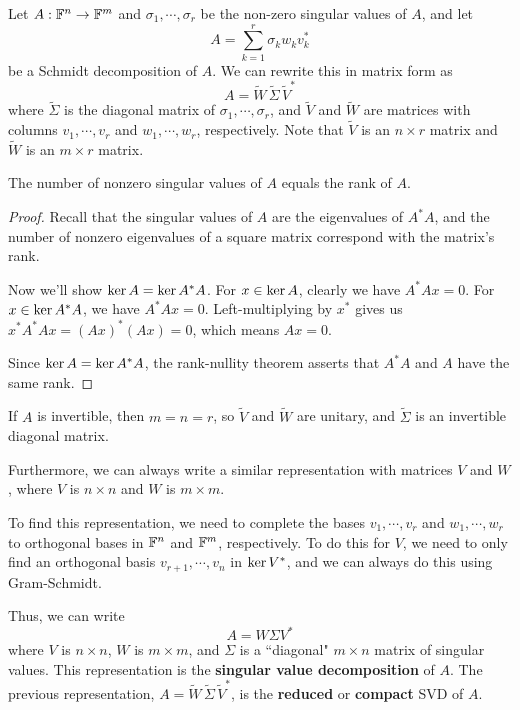 Let $A : \mathbb{F}^{n} \rightarrow \mathbb{F}^{m}$ and $\sigma_{1}, \cdots, \sigma_{r}$ be the non-zero singular values of $A$, and let 
$$A = \sum_{k=1}^{r} \sigma_{k} w_{k} v_{k}^{*}$$ 
be a Schmidt decomposition of $A$. We can rewrite this in matrix form as 
$$A = \widetilde{W} \, \widetilde{\Sigma} \, \widetilde{V}^{*}$$
where $\widetilde{\Sigma}$ is the diagonal matrix of $\sigma_{1}, \cdots, \sigma_{r}$, and $\widetilde{V}$ and $\widetilde{W}$ are matrices with columns $v_{1}, \cdots, v_{r}$ and $w_{1}, \cdots, w_{r}$, respectively. Note that $\widetilde{V}$ is an $n \times r$ matrix and $\widetilde{W}$ is an $m \times r$ matrix. 

\begin{theorem}
The number of nonzero singular values of $A$ equals the rank of $A$.
\end{theorem}

\begin{proof}
Recall that the singular values of $A$ are the eigenvalues of $A^{*}A$, and the number of nonzero eigenvalues of a square matrix correspond with the matrix's rank.  

Now we'll show $\operatorname{ker} A = \operatorname{ker} A^{*}A$. For $x \in \operatorname{ker} A$, clearly we have $A^{*}Ax = 0$. For $x \in \operatorname{ker} A^{*}A$, we have $A^{*}Ax = 0$. Left-multiplying by $x^{*}$ gives us $x^{*} A^{*} A x = (Ax)^{*} (Ax) = 0$, which means $Ax = 0$. 

Since $\operatorname{ker} A = \operatorname{ker} A^{*}A$, the rank-nullity theorem asserts that $A^{*}A$ and $A$ have the same rank. 
\end{proof}

If $A$ is invertible, then $m = n = r$, so $\widetilde{V}$ and $\widetilde{W}$ are unitary, and $\widetilde{\Sigma}$ is an invertible diagonal matrix. 

Furthermore, we can always write a similar representation with matrices $V$ and $W$, where $V$ is $n \times n$ and $W$ is $m \times m$. 

To find this representation, we need to complete the bases $v_{1}, \cdots, v_{r}$ and $w_{1}, \cdots, w_{r}$ to orthogonal bases in $\mathbb{F}^{n}$ and $\mathbb{F}^{m}$, respectively. To do this for $V$, we need to only find an orthogonal basis $v_{r+1}, \cdots, v_{n}$ in $\operatorname{ker} V^{*}$, and we can always do this using Gram-Schmidt. 

Thus, we can write 
$$A = W \Sigma V^{*}$$
where $V$ is $n \times n$, $W$ is $m \times m$, and $\Sigma$ is a ``diagonal" $m \times n$ matrix of singular values. This representation is the \textbf{singular value decomposition} of $A$. The previous representation, $A = \widetilde{W} \, \widetilde{\Sigma} \, \widetilde{V}^{*}$, is the \textbf{reduced} or \textbf{compact} SVD of $A$.

